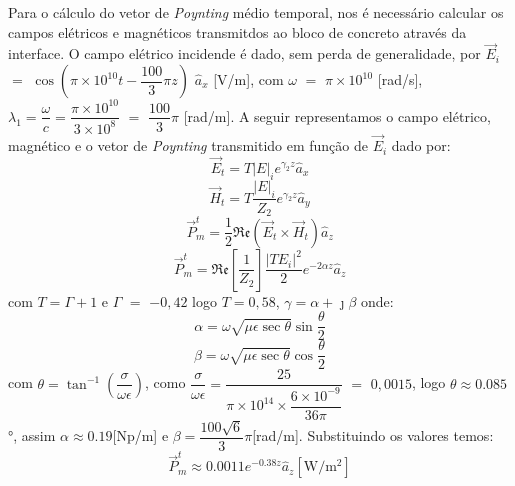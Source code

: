 \begin{enumerate}[1.]
Para o cálculo do vetor de \emph{Poynting} médio temporal, nos é necessário calcular os campos elétricos e magnéticos transmitdos ao bloco de concreto através da interface.  O campo elétrico incidende é dado, sem perda de generalidade, por $\vec{E}_{i}$ $=$ $\cos(\pi \times 10^{10} t - \dfrac{100}{3}\pi z)$ $\hat{a}_{x}$ [\si{\volt/\meter}], com $\omega$ $=$ $\pi \times 10^{10}$ [\si{\radian/\second}], $\lambda_{1} = \dfrac{\omega}{c} = \dfrac{\pi \times 10^{10}}{3 \times 10^{8}}$ $=$ $\dfrac{100}{3}\pi$ [\si{\radian/\meter}]. A seguir representamos o  campo elétrico, magnético e o vetor de \emph{Poynting} transmitido em função de $\vec{E}_{i}$ dado por: $$\vec{E}_{t}  =  T |E|_{i} e^{\gamma_{2} z} \hat{a}_{x}$$ $$\vec{H}_{t}  =  T \dfrac{|E|_{i}}{Z_{2}} e^{\gamma_{2} z} \hat{a}_{y}$$ $$\vec{P}_{m}^{t} = \dfrac{1}{2}\mathfrak{Re}(\vec{E}_{t} \times \vec{H}_{t}) \hat{a}_{z}$$ $$\vec{P}_{m}^{t} = \mathfrak{Re}\left[\dfrac{1}{Z_{2}}\right] \dfrac{|T E_{i}|^2}{2}e^{-2\alpha z} \hat{a}_{z}$$ com $T = \Gamma + 1$ e $\Gamma$ $=$ $-0,42$ logo $T = 0,58$, $\gamma = \alpha + \jmath \beta$  onde: $$\alpha = \omega \sqrt{\mu\epsilon \sec{\theta}} \sin{\dfrac{\theta}{2}}$$ $$\beta = \omega \sqrt{\mu\epsilon \sec{\theta}} \cos{\dfrac{\theta}{2}}$$ com $\theta = \tan^{-1}\left(\dfrac{\sigma}{\omega\epsilon}\right)$, como $\dfrac{\sigma}{\omega\epsilon} = \dfrac{25}{\pi \times 10^{14} \times \dfrac{6 \times 10^{-9}}{36\pi}}$ $=$ $0,0015$, logo $\theta \approx 0.085$\si{\degree}, assim $\alpha \approx 0.19$[\si{\neper/\meter}] e $\beta = \dfrac{100\sqrt{6}}{3}\pi$[\si{\radian/\meter}]. Substituindo os valores temos: $$\vec{P}_{m}^{t} \approx 0.0011 e^{-0.38 z} \hat{a}_{z} [\si{\watt/\meter^{2}}]$$
\end{enumerate}
 
